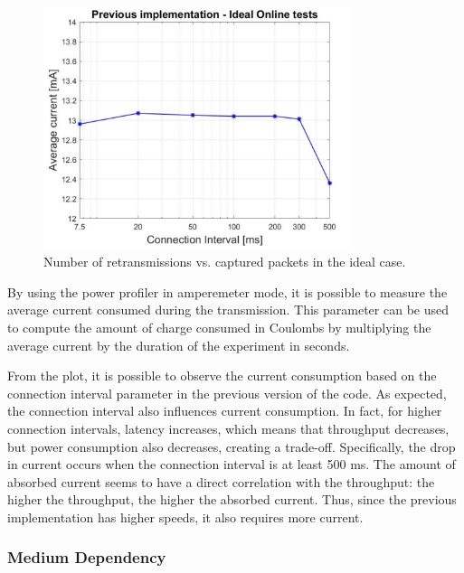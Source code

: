 \documentclass{Configuration_Files/PoliMi3i_thesis}
\begin{document}
\begin{figure}[h!]
    \centering
    \includegraphics[width=0.8\textwidth]{Results Manuel/figure6}
    \caption{Number of retransmissions vs. captured packets in the ideal case.}
    \label{fig:figure1}
\end{figure}

By using the power profiler in amperemeter mode, it is possible to measure the average current consumed during the transmission. This parameter can be used to compute the amount of charge consumed in Coulombs by multiplying the average current by the duration of the experiment in seconds.

From the plot, it is possible to observe the current consumption based on the connection interval parameter in the previous version of the code. As expected, the connection interval also influences current consumption. In fact, for higher connection intervals, latency increases, which means that throughput decreases, but power consumption also decreases, creating a trade-off. Specifically, the drop in current occurs when the connection interval is at least 500 ms. The amount of absorbed current seems to have a direct correlation with the throughput: the higher the throughput, the higher the absorbed current. Thus, since the previous implementation has higher speeds, it also requires more current.

\subsubsection*{Medium Dependency}
\end{document}
